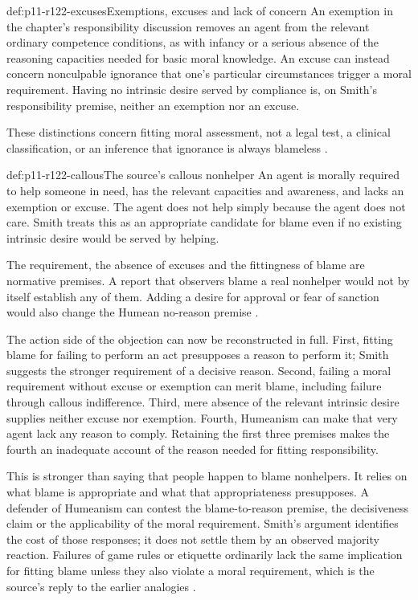 \begin{hbdefinition}{def:p11-r122-excuses}{Exemptions, excuses and lack of concern}
An exemption in the chapter's responsibility discussion removes an agent
from the relevant ordinary competence conditions, as with infancy or a
serious absence of the reasoning capacities needed for basic moral
knowledge. An excuse can instead concern nonculpable ignorance that
one's particular circumstances trigger a moral requirement. Having no
intrinsic desire served by compliance is, on Smith's responsibility
premise, neither an exemption nor an excuse.

These distinctions concern fitting moral assessment, not a legal test,
a clinical classification, or an inference that ignorance is always
blameless \parencite[pp.~696--697]{Smith2021MoralReasons}.
\end{hbdefinition}

\begin{hbexample}{def:p11-r122-callous}{The source's callous nonhelper}
An agent is morally required to help someone in need, has the relevant
capacities and awareness, and lacks an exemption or excuse. The agent
does not help simply because the agent does not care. Smith treats this
as an appropriate candidate for blame even if no existing intrinsic
desire would be served by helping.

The requirement, the absence of excuses and the fittingness of blame
are normative premises. A report that observers blame a real nonhelper
would not by itself establish any of them. Adding a desire for approval
or fear of sanction would also change the Humean no-reason premise
\parencite[pp.~696--698]{Smith2021MoralReasons}.
\end{hbexample}

The action side of the objection can now be reconstructed in full.
First, fitting blame for failing to perform an act presupposes a reason
to perform it; Smith suggests the stronger requirement of a decisive
reason. Second, failing a moral requirement without excuse or exemption
can merit blame, including failure through callous indifference. Third,
mere absence of the relevant intrinsic desire supplies neither excuse
nor exemption. Fourth, Humeanism can make that very agent lack any reason
to comply. Retaining the first three premises makes the fourth an
inadequate account of the reason needed for fitting responsibility.

This is stronger than saying that people happen to blame nonhelpers.
It relies on what blame is appropriate and what that appropriateness
presupposes. A defender of Humeanism can contest the blame-to-reason
premise, the decisiveness claim or the applicability of the moral
requirement. Smith's argument identifies the cost of those responses;
it does not settle them by an observed majority reaction. Failures of
game rules or etiquette ordinarily lack the same implication for fitting
blame unless they also violate a moral requirement, which is the source's
reply to the earlier analogies
\parencite[pp.~696--697]{Smith2021MoralReasons}.

